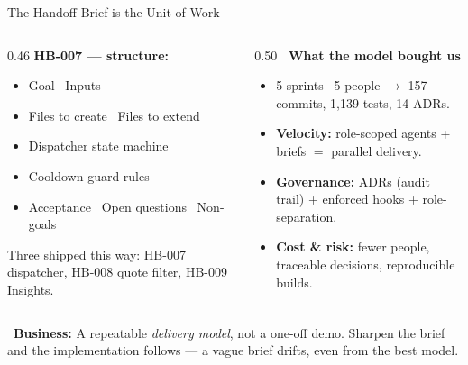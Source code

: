 \documentclass[aspectratio=169,11pt]{beamer}
\providecommand{\faChartPie}{}
\providecommand{\faBalanceScale}{}
\newcommand{\biz}[1]{\vspace{0.3em}\par{\footnotesize\color{moodorange}\faChartPie\ \textbf{Business:} #1}}
\begin{document}
\begin{frame}{The Handoff Brief is the Unit of Work}
\begin{columns}[T,onlytextwidth]
  \begin{column}{0.46\textwidth}
    \textbf{HB-007 --- structure:}
    \begin{itemize}\footnotesize
      \item Goal \textperiodcentered\ Inputs
      \item Files to create \textperiodcentered\ Files to extend
      \item Dispatcher state machine
      \item Cooldown guard rules
      \item Acceptance \textperiodcentered\ Open questions \textperiodcentered\ Non-goals
    \end{itemize}
    {\footnotesize Three shipped this way: HB-007 dispatcher, HB-008 quote filter, HB-009 Insights.}
  \end{column}
  \begin{column}{0.50\textwidth}
    \textbf{\color{moodgreen}\faBalanceScale\ What the model bought us}
    \begin{itemize}\footnotesize
      \item 5 sprints \textperiodcentered\ 5 people $\to$ 157 commits, 1{,}139 tests, 14 ADRs.
      \item \textbf{Velocity:} role-scoped agents + briefs $=$ parallel delivery.
      \item \textbf{Governance:} ADRs (audit trail) + enforced hooks + role-separation.
      \item \textbf{Cost \& risk:} fewer people, traceable decisions, reproducible builds.
    \end{itemize}
  \end{column}
\end{columns}
\biz{A repeatable \emph{delivery model}, not a one-off demo. Sharpen the brief and the implementation follows --- a vague brief drifts, even from the best model.}
\end{frame}

\end{document}
